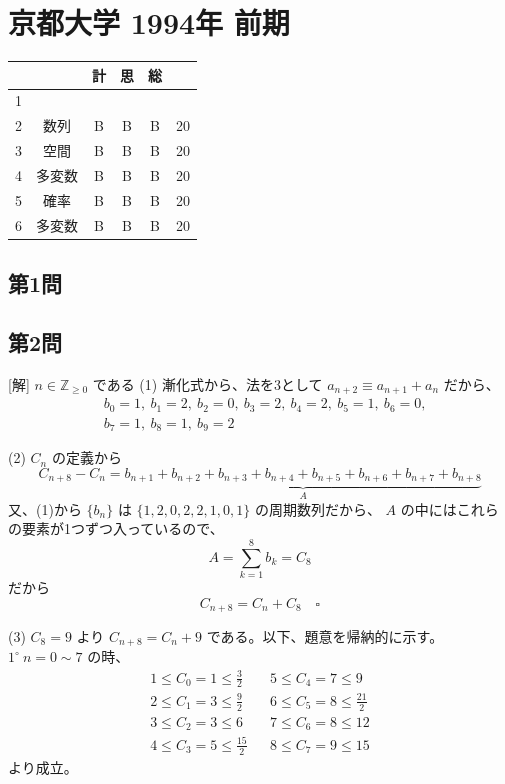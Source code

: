 \documentclass[../main.tex]{subfiles}
\begin{document}
\section*{京都大学 1994年 前期}

\begin{center}
  \begin{tabular}{|c|c|c|c|c|c|}
    \hline
    & & 計 & 思 & 総 & \\
    \hline
    1 & & & & & \\
    \hline
    2 & 数列 & B & B & B & 20 \\
    \hline
    3 & 空間 & B & B & B & 20 \\
    \hline
    4 & 多変数 & B & B & B & 20 \\
    \hline
    5 & 確率 & B & B & B & 20 \\
    \hline
    6 & 多変数 & B & B & B & 20 \\
    \hline
  \end{tabular}
\end{center}

\subsection*{第1問}

\subsection*{第2問}
[解] $n \in \mathbb{Z}_{\ge 0}$ である
(1) 漸化式から、法を3として $a_{n+2} \equiv a_{n+1} + a_n$ だから、
\begin{align*}
  &b_0 = 1,\ b_1 = 2,\ b_2 = 0,\ b_3 = 2,\ b_4 = 2,\ b_5 = 1,\ b_6 = 0, \\
  &b_7 = 1,\ b_8 = 1,\ b_9 = 2
\end{align*}

(2) $C_n$ の定義から
$$C_{n+8} - C_n = \underbrace{b_{n+1} + b_{n+2} + b_{n+3} + b_{n+4} + b_{n+5} + b_{n+6} + b_{n+7} + b_{n+8}}_{A}$$
又、(1)から $\{b_n\}$ は $\{1, 2, 0, 2, 2, 1, 0, 1\}$ の周期数列だから、
$A$ の中にはこれらの要素が1つずつ入っているので、
$$A = \sum_{k=1}^8 b_k = C_8$$
だから
$$C_{n+8} = C_n + C_8 \quad \square$$

(3) $C_8 = 9$ より $C_{n+8} = C_n + 9$ である。以下、題意を帰納的に示す。\\
$1^\circ\ n=0\sim 7$ の時、
\begin{align*}
  1 \le C_0 = 1 \le \frac{3}{2} && 5 \le C_4 = 7 \le 9 \\
  2 \le C_1 = 3 \le \frac{9}{2} && 6 \le C_5 = 8 \le \frac{21}{2} \\
  3 \le C_2 = 3 \le 6 && 7 \le C_6 = 8 \le 12 \\
  4 \le C_3 = 5 \le \frac{15}{2} && 8 \le C_7 = 9 \le 15
\end{align*}
より成立。
\end{document}
